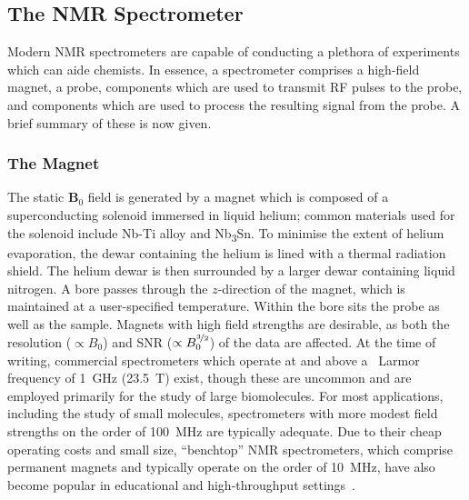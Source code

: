 \subsection{The NMR Spectrometer}

Modern \ac{NMR} spectrometers are capable of conducting a plethora of
experiments which can aide chemists.
In essence, a spectrometer comprises a high-field magnet, a probe, components
which are used to transmit \ac{RF} pulses to the probe, and components which
are used to process the resulting signal from the probe. A brief summary of
these is now given.

\subsubsection{The Magnet}
The static $\symbf{B}_0$ field is generated by a magnet which is composed of a
superconducting solenoid immersed in liquid helium; common materials used for
the solenoid include Nb-Ti alloy and Nb\textsubscript{3}Sn. To minimise the
extent of helium evaporation, the dewar containing the helium is lined with
a thermal radiation shield. The helium dewar is then surrounded by a larger
dewar containing liquid nitrogen. A bore passes through the $z$-direction of
the magnet, which is maintained at a user-specified temperature. Within the
bore sits the probe as well as the sample. Magnets with high field
strengths are desirable, as both the resolution ($\propto B_0$) and \ac{SNR}
($\propto B_0^{\nicefrac{3}{2}}$) of the data are affected. At the
time of writing, commercial spectrometers which operate at and above a
\proton\ Larmor frequency of \qty{1}{\giga\hertz} (\qty{23.5}{\tesla}) exist,
though these are uncommon and are employed primarily for the study of large
biomolecules. For most applications, including the study of small molecules,
spectrometers with more modest field strengths on the order of
\qty{100}{\mega\hertz} are typically adequate. Due to their cheap operating
costs and small size, ``benchtop'' \ac{NMR} spectrometers, which
comprise permanent magnets and typically operate on the order of
\qty{10}{\mega\hertz}, have also become popular in educational and
high-throughput settings~\cite{Giberson2021}.

